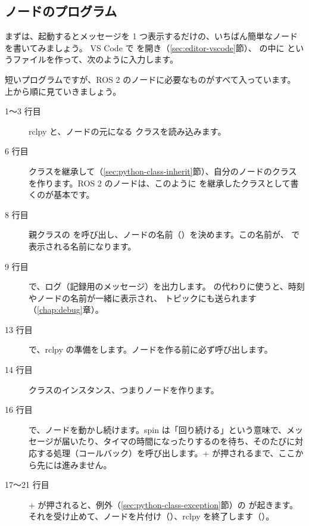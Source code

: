 \subsection{ノードのプログラム}

まずは、起動するとメッセージを 1 つ表示するだけの、いちばん簡単なノードを書いてみましょう。
VS Code で  を開き（\ref{sec:editor-vscode}節）、 の中に  というファイルを作って、次のように入力します。


短いプログラムですが、ROS 2 のノードに必要なものがすべて入っています。
上から順に見ていきましょう。

\begin{description}
  \item[1〜3 行目] rclpy と、ノードの元になる  クラスを読み込みます。
  \item[6 行目]  クラスを継承して（\ref{sec:python-class-inherit}節）、自分のノードのクラス  を作ります。ROS 2 のノードは、このように  を継承したクラスとして書くのが基本です。
  \item[8 行目] 親クラスの  を呼び出し、ノードの名前（）を決めます。この名前が、 で表示される名前になります。
  \item[9 行目]  で、ログ（記録用のメッセージ）を出力します。 の代わりに使うと、時刻やノードの名前が一緒に表示され、 トピックにも送られます（\ref{chap:debug}章）。
  \item[13 行目]  で、rclpy の準備をします。ノードを作る前に必ず呼び出します。
  \item[14 行目]  クラスのインスタンス、つまりノードを作ります。
  \item[16 行目]  で、ノードを動かし続けます。spin は「回り続ける」という意味で、メッセージが届いたり、タイマの時間になったりするのを待ち、そのたびに対応する処理（コールバック）を呼び出します。+ が押されるまで、ここから先には進みません。
  \item[17〜21 行目] + が押されると、例外（\ref{sec:python-class-exception}節）の  が起きます。それを受け止めて、ノードを片付け（）、rclpy を終了します（）。
\end{description}

